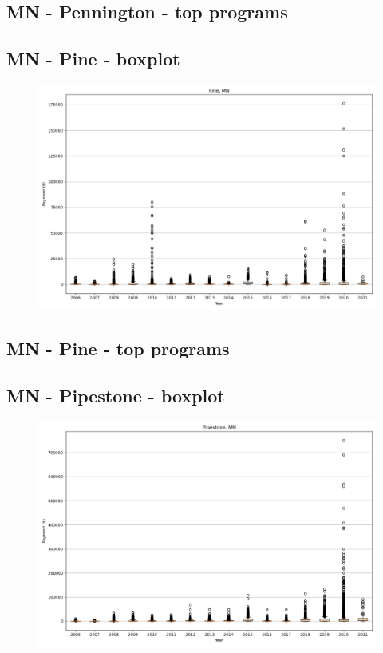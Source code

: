 \subsection*{MN - Pennington - top programs}

\newpage
\subsection*{MN - Pine - boxplot}
\begin{figure}[h]
\centering
\includegraphics[width=7in]{../output/boxplots/counties/Pine-MN_boxplot.png}
\end{figure}


\subsection*{MN - Pine - top programs}

\newpage
\subsection*{MN - Pipestone - boxplot}
\begin{figure}[h]
\centering
\includegraphics[width=7in]{../output/boxplots/counties/Pipestone-MN_boxplot.png}
\end{figure}



